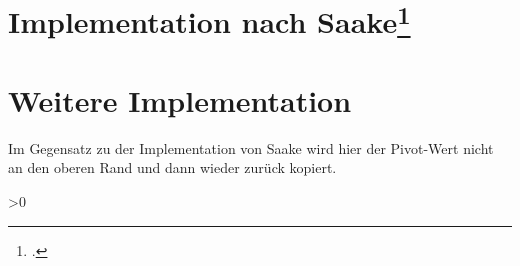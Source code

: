 \documentclass{lehramt-informatik-haupt}
\begin{document}
\newpage

\section{Implementation nach Saake\footcite[Seite 138 (PDF 156)]{saake}}


\newpage

\section{Weitere Implementation}

Im Gegensatz zu der Implementation von Saake wird hier der Pivot-Wert
nicht an den oberen Rand und dann wieder zurück kopiert.


\loop
\QSpivotStep
\ifnum\value{pivotcount}>0
  \QSsortStep
\repeat

\literatur
\end{document}
